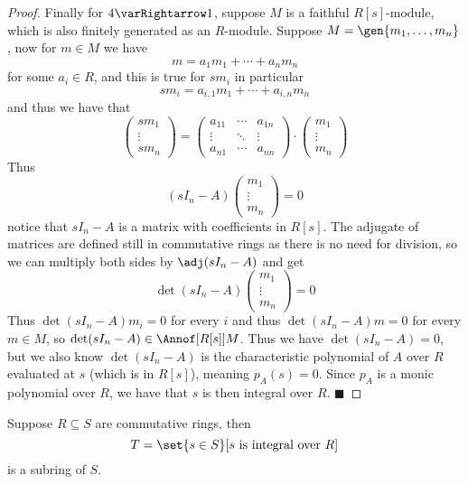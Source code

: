 \documentclass[10pt]{article}
\def\qed{%
    \ifmmode%
        \eqno\blacksquare%
    \else%
        \hskip1cm\allowbreak\hbox{}\nobreak\hfill$\blacksquare$%
    \fi%
}
\begin{document}
\begin{proof}
   Finally for $4\varRightarrow1$, suppose $M$ is a faithful $R[s]$-module, which is also finitely generated as an $R$-module.
   Suppose $M=\gen{m_1,\dots,m_n}$, now for $m\in M$ we have
   \[ m = a_1m_1 + \cdots + a_nm_n \]
   for some $a_i\in R$, and this is true for $sm_i$ in particular
   \[ sm_i = a_{i,1}m_1 + \cdots + a_{i,n}m_n \]
   and thus we have that
   \[ \begin{pmatrix} sm_1\\\vdots\\sm_n \end{pmatrix} = \begin{pmatrix} a_{11} &\cdots&a_{1n}\\\vdots&\ddots&\vdots\\a_{n1}&\cdots&a_{nn} \end{pmatrix}\cdot\begin{pmatrix} m_1\\\vdots\\m_n\end{pmatrix} \]
   Thus
   \[ (sI_n-A)\begin{pmatrix} m_1\\\vdots\\m_n \end{pmatrix} = 0 \]
   notice that $sI_n-A$ is a matrix with coefficients in $R[s]$.
   The adjugate of matrices are defined still in commutative rings as there is no need for division, so we can multiply both sides by $\adj(sI_n-A)$ and get
   \[ \det(sI_n-A)\begin{pmatrix} m_1\\\vdots\\m_n \end{pmatrix} = 0 \]
   Thus $\det(sI_n-A)m_i=0$ for every $i$ and thus $\det(sI_n-A)m=0$ for every $m\in M$, so $\det(sI_n-A)\in\Annof[{R[s]}]M$.
   Thus we have $\det(sI_n-A)=0$, but we also know $\det(sI_n-A)$ is the characteristic polynomial of $A$ over $R$ evaluated at $s$ (which is in $R[s]$), meaning $p_A(s)=0$.
   Since $p_A$ is a monic polynomial over $R$, we have that $s$ is then integral over $R$.
   \qed

\end{proof}

\begin{prop*}

    Suppose $R\subseteq S$ are commutative rings, then
    \[ T=\set{s\in S}[s\text{ is integral over }R] \]
    is a subring of $S$.

\end{prop*}
\end{document}
